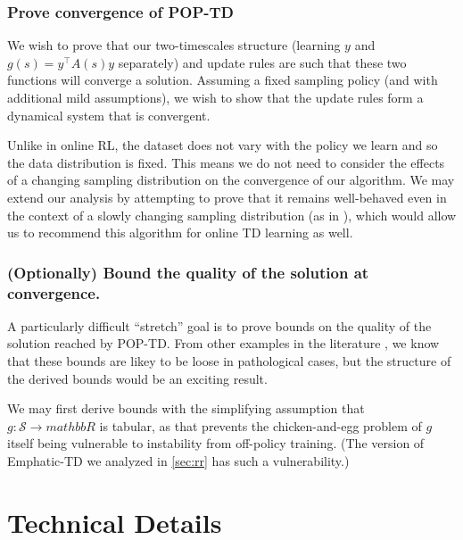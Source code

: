 \documentclass[11pt]{article}
\begin{document}
\subsubsection{Prove convergence of POP-TD}

We wish to prove that our two-timescales structure (learning $y$ and $g(s) = y^\top A(s) y$ separately) and update rules are such that these two functions will converge a solution. Assuming a fixed sampling policy (and with additional mild assumptions), we wish to show that the update rules form a dynamical system that is convergent.

Unlike in online RL, the dataset does not vary with the policy we learn and so the data distribution is fixed. This means we do not need to consider the effects of a changing sampling distribution on the convergence of our algorithm. We may extend our analysis by attempting to prove that it remains well-behaved even in the context of a slowly changing sampling distribution (as in \cite{zhang2021breaking}), which would allow us to recommend this algorithm for online TD learning as well.


\subsubsection{(Optionally) Bound the quality of the solution at convergence. }

A particularly difficult ``stretch'' goal is to prove bounds on the quality of the solution reached by POP-TD. From other examples in the literature \cite{zhang2020provably,zhang2021breaking}, we know that these bounds are likey to be loose in pathological cases, but the structure of the derived bounds would be an exciting result.

We may first derive bounds with the simplifying assumption that $g : \mathcal S \to mathbb R$ is tabular, as that prevents the chicken-and-egg problem of $g$ itself being vulnerable to instability from off-policy training. (The version of Emphatic-TD we analyzed in \ref{sec:rr} has such a vulnerability.)


\clearpage

\printbibliography

\clearpage

\appendix

\section{Technical Details}
\end{document}
